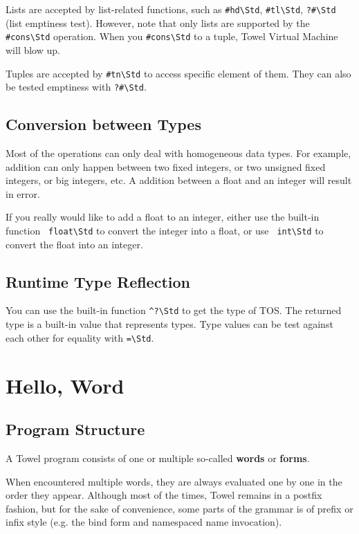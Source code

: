\documentclass{report}
\newcommand{\mstd}[1]{\texttt{#1\textbackslash Std}}
\newcommand{\mtilde}[1]{\textasciitilde}
\begin{document}
Lists are accepted by list-related functions, such as \mstd{\#hd}, \mstd{\#tl}, \mstd{?\#} (list emptiness test). However, note that only lists are supported by the \mstd{\#cons} operation. When you \mstd{\#cons} to a tuple, Towel Virtual Machine will blow up.

Tuples are accepted by \mstd{\#tn} to access specific element of them. They can also be tested emptiness with \mstd{?\#}.

\section{Conversion between Types}

Most of the operations can only deal with homogeneous data types. For example, addition can only happen between two fixed integers, or two unsigned fixed integers, or big integers, etc. A addition between a float and an integer will result in error.

If you really would like to add a float to an integer, either use the built-in function \mstd{\mtilde ~float} to convert the integer into a float, or use \mstd{\mtilde  ~int} to convert the float into an integer.

\section{Runtime Type Reflection}

You can use the built-in function \mstd{\string^?} to get the type of TOS. The returned type is a built-in value that represents types. Type values can be test against each other for equality with \mstd{\string=}.

\chapter{Hello, Word}
\label{chap:forms}

\section{Program Structure}\label{sec:basics}

A Towel program consists of one or multiple so-called \textbf{words} or \textbf{forms}.

When encountered multiple words, they are always evaluated one by one in the order they appear. Although most of the times, Towel remains in a postfix fashion, but for the sake of convenience, some parts of the grammar is of prefix or infix style (e.g. the bind form and namespaced name invocation).
\end{document}
